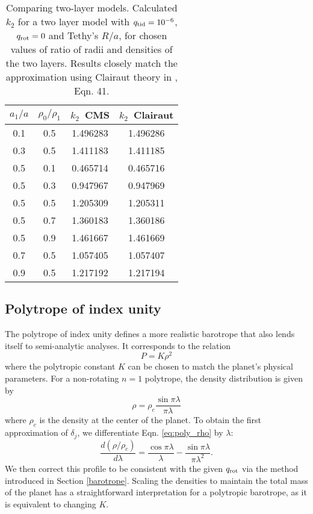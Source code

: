 %
\begin{table}[h]
 \centering   
\caption{Comparing two-layer models. Calculated $k_2$ for a two layer model with $q_{\rm 
tid}=10^{-6}$, $q_{\rm rot}=0$  
and Tethy's $R/a$, for chosen values of ratio of radii and densities of
the two layers. Results closely match the approximation using Clairaut theory in
\citet{folonier2015}, Eqn. 41.
  \label{tab:folonier_table}}
    \begin{tabular}{cccc}
        \hline
    {$a_1/a$}   &  {$\rho_0/\rho_1$}  &  
    {$k_2$~CMS}  &  {$k_2$~Clairaut}  \\
    \hline
0.1       &  0.5             &  1.496283   &  1.496286        \\
0.3       &  0.5             &  1.411183   &  1.411185        \\
0.5       &  0.1             &  0.465714   &  0.465716        \\
0.5       &  0.3             &  0.947967   &  0.947969        \\
0.5       &  0.5             &  1.205309   &  1.205311        \\
0.5       &  0.7             &  1.360183   &  1.360186        \\
0.5       &  0.9             &  1.461667   &  1.461669        \\
0.7       &  0.5             &  1.057405   &  1.057407        \\
0.9       &  0.5             &  1.217192   &  1.217194        \\
\hline
\end{tabular}
\end{table}

\subsection{Polytrope of index unity} \label{polytrope}

The polytrope of index unity defines a more realistic barotrope that also lends
itself to semi-analytic analyses. It corresponds to the relation
%
\begin{equation}
    P = K\rho^2
    \label{eq:poly}
\end{equation}
%
where the polytropic constant $K$ can be chosen to match the planet's physical
parameters. For a non-rotating $n=1$ polytrope, the density distribution is given by
%
\begin{equation}
    \rho = \rho_c \frac{\sin \pi \lambda}{\pi \lambda}
    \label{eq:poly_rho}
\end{equation}
%
where $\rho_c$ is the density at the center of the planet.  To obtain the first
approximation of $\delta_j$, we differentiate Eqn. \eqref{eq:poly_rho} by $\lambda$:
%
\begin{equation}
    \frac{d(\rho/\rho_c)}{d\lambda} = \frac{\cos \pi \lambda}{\lambda} 
    - \frac{\sin \pi \lambda}{\pi \lambda^2}.
\end{equation}
%
We then correct this profile to be consistent with the given $q_{\rm rot}$ via the
method introduced in Section \ref{barotrope}. Scaling the densities to maintain the
total mass of the planet has a straightforward interpretation for a polytropic
barotrope, as it is equivalent to changing $K$.


